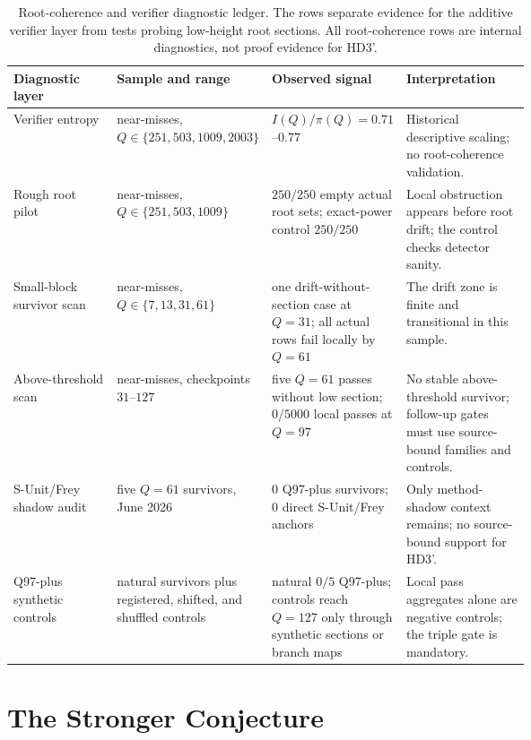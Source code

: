 \documentclass[11pt,a4paper]{article}
\begin{document}
\begin{table}[htb]
\centering
\small
\begin{tabularx}{\textwidth}{@{} >{\raggedright\arraybackslash}p{0.20\linewidth} >{\raggedright\arraybackslash}p{0.25\linewidth} >{\raggedright\arraybackslash}p{0.22\linewidth} >{\raggedright\arraybackslash}X @{}}
\toprule
Diagnostic layer & Sample and range & Observed signal & Interpretation \\
\midrule
Verifier entropy & 1000 near-misses, $Q\in\{251,503,1009,2003\}$ &
$I(Q)/\pi(Q)=0.71$--$0.77$ &
Historical descriptive scaling; no root-coherence validation. \\
\addlinespace
Rough root pilot & 250 near-misses, $Q\in\{251,503,1009\}$ &
$250/250$ empty actual root sets; exact-power control $250/250$ &
Local obstruction appears before root drift; the control checks detector sanity. \\
\addlinespace
Small-block survivor scan & 250 near-misses, $Q\in\{7,13,31,61\}$ &
one drift-without-section case at $Q=31$; all actual rows fail locally by $Q=61$ &
The drift zone is finite and transitional in this sample. \\
\addlinespace
Above-threshold scan & 5000 near-misses, checkpoints $31$--$127$ &
five $Q=61$ passes without low section; $0/5000$ local passes at $Q=97$ &
No stable above-threshold survivor; follow-up gates must use source-bound families and controls. \\
\addlinespace
S-Unit/Frey shadow audit & five $Q=61$ survivors, June 2026 &
$0$ Q97-plus survivors; $0$ direct S-Unit/Frey anchors &
Only method-shadow context remains; no source-bound support for HD3'. \\
\addlinespace
Q97-plus synthetic controls & natural survivors plus registered, shifted, and shuffled controls &
natural $0/5$ Q97-plus; controls reach $Q=127$ only through synthetic sections or branch maps &
Local pass aggregates alone are negative controls; the triple gate is mandatory. \\
\bottomrule
\end{tabularx}
\caption{Root-coherence and verifier diagnostic ledger. The rows separate
evidence for the additive verifier layer from tests probing low-height
root sections. All root-coherence rows are internal diagnostics, not
proof evidence for HD3'.}
\label{tab:root-diagnostics}
\end{table}

\section{The Stronger Conjecture}
\end{document}
